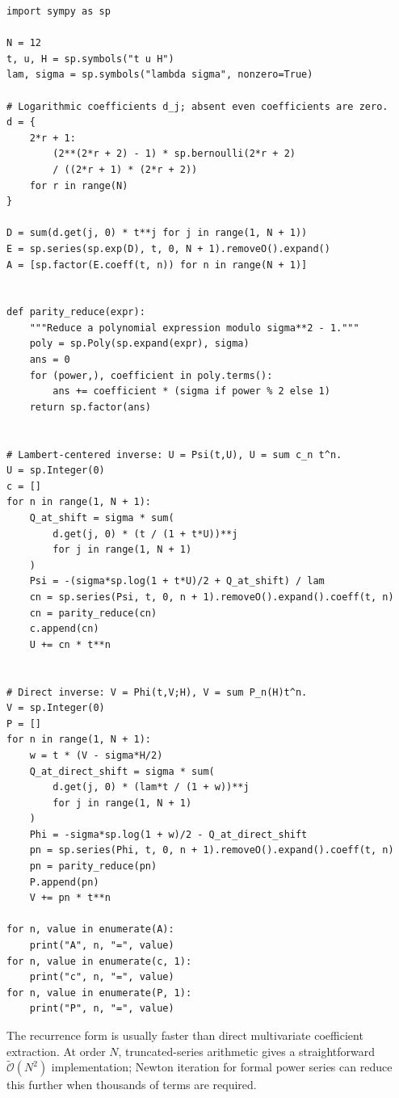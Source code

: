 \documentclass[11pt,a4paper]{article}
\numberwithin{equation}{section}
\theoremstyle{definition}
\theoremstyle{remark}
\newcommand{\Ord}{\mathcal O}
\begin{document}
\begin{lstlisting}[style=pythonstyle,caption={All-order coefficient generation.}]
import sympy as sp

N = 12
t, u, H = sp.symbols("t u H")
lam, sigma = sp.symbols("lambda sigma", nonzero=True)

# Logarithmic coefficients d_j; absent even coefficients are zero.
d = {
    2*r + 1:
        (2**(2*r + 2) - 1) * sp.bernoulli(2*r + 2)
        / ((2*r + 1) * (2*r + 2))
    for r in range(N)
}

D = sum(d.get(j, 0) * t**j for j in range(1, N + 1))
E = sp.series(sp.exp(D), t, 0, N + 1).removeO().expand()
A = [sp.factor(E.coeff(t, n)) for n in range(N + 1)]


def parity_reduce(expr):
    """Reduce a polynomial expression modulo sigma**2 - 1."""
    poly = sp.Poly(sp.expand(expr), sigma)
    ans = 0
    for (power,), coefficient in poly.terms():
        ans += coefficient * (sigma if power % 2 else 1)
    return sp.factor(ans)


# Lambert-centered inverse: U = Psi(t,U), U = sum c_n t^n.
U = sp.Integer(0)
c = []
for n in range(1, N + 1):
    Q_at_shift = sigma * sum(
        d.get(j, 0) * (t / (1 + t*U))**j
        for j in range(1, N + 1)
    )
    Psi = -(sigma*sp.log(1 + t*U)/2 + Q_at_shift) / lam
    cn = sp.series(Psi, t, 0, n + 1).removeO().expand().coeff(t, n)
    cn = parity_reduce(cn)
    c.append(cn)
    U += cn * t**n


# Direct inverse: V = Phi(t,V;H), V = sum P_n(H)t^n.
V = sp.Integer(0)
P = []
for n in range(1, N + 1):
    w = t * (V - sigma*H/2)
    Q_at_direct_shift = sigma * sum(
        d.get(j, 0) * (lam*t / (1 + w))**j
        for j in range(1, N + 1)
    )
    Phi = -sigma*sp.log(1 + w)/2 - Q_at_direct_shift
    pn = sp.series(Phi, t, 0, n + 1).removeO().expand().coeff(t, n)
    pn = parity_reduce(pn)
    P.append(pn)
    V += pn * t**n

for n, value in enumerate(A):
    print("A", n, "=", value)
for n, value in enumerate(c, 1):
    print("c", n, "=", value)
for n, value in enumerate(P, 1):
    print("P", n, "=", value)
\end{lstlisting}

The recurrence form is usually faster than direct multivariate coefficient
extraction.  At order \(N\), truncated-series arithmetic gives a
straightforward \(\widetilde{\Ord}(N^2)\) implementation; Newton iteration
for formal power series can reduce this further when thousands of terms are
required.
\end{document}
